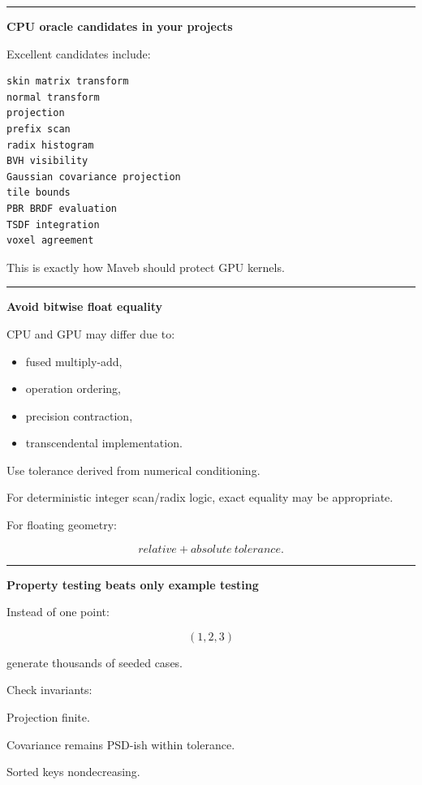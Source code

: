 \begin{center}\rule{0.5\linewidth}{0.5pt}\end{center}

\textbf{CPU oracle candidates in your projects}

Excellent candidates include:

\begin{verbatim}
skin matrix transform
normal transform
projection
prefix scan
radix histogram
BVH visibility
Gaussian covariance projection
tile bounds
PBR BRDF evaluation
TSDF integration
voxel agreement
\end{verbatim}

This is exactly how Maveb should protect GPU kernels.

\begin{center}\rule{0.5\linewidth}{0.5pt}\end{center}

\textbf{Avoid bitwise float equality}

CPU and GPU may differ due to:

\begin{itemize}
\tightlist
\item
  fused multiply-add,
\item
  operation ordering,
\item
  precision contraction,
\item
  transcendental implementation.
\end{itemize}

Use tolerance derived from numerical conditioning.

For deterministic integer scan/radix logic, exact equality may be appropriate.

For floating geometry:

\[
relative+absolute\ tolerance.
\]

\begin{center}\rule{0.5\linewidth}{0.5pt}\end{center}

\textbf{Property testing beats only example testing}

Instead of one point:

\[
(1,2,3)
\]

generate thousands of seeded cases.

Check invariants:

Projection finite.

Covariance remains PSD-ish within tolerance.

Sorted keys nondecreasing.

